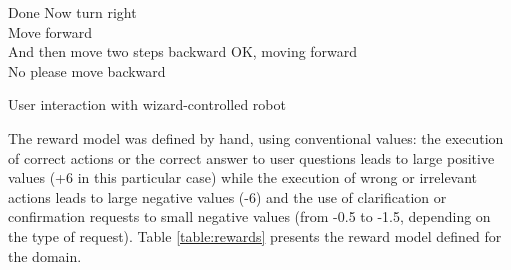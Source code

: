 \begin{Transcript}[p]
\begin{dialogue}
 Done\vspace{2mm}
 Now turn right \vspace{1mm} \\ 
 \vspace{2mm}
 Move forward \vspace{1mm} \\ 
 \vspace{2mm}
 And then move two steps backward\vspace{2mm}
 OK, moving forward\vspace{1mm} \\
 \vspace{2mm}
 No please move backward \vspace{1mm} \\ 
 \vspace{2mm}
\end{dialogue}
\vspace{-4mm} \hspace{1cm} \vspace{3mm}
\caption{User interaction with wizard-controlled robot}
\end{Transcript}

The reward model was defined by hand, using conventional values: the execution of correct actions or the correct answer to user questions leads to large positive values (+6 in this particular case) while the execution of wrong or irrelevant actions leads to large negative values (-6) and the use of clarification or confirmation requests to small negative values (from -0.5 to -1.5, depending on the type of request). Table \ref{table:rewards} presents the reward model defined for the domain. 


